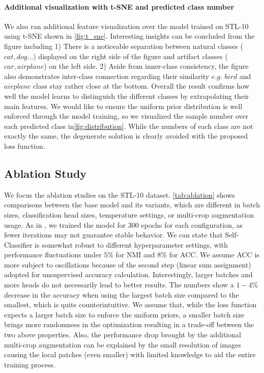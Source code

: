\documentclass{article}
\begin{document}
\paragraph{Additional visualization with t-SNE and predicted class number}
We also ran additional feature visualization over the model trained on STL-10 using t-SNE shown in \autoref{fig:t_sne}. Interesting insights can be concluded from the figure including 1) There is a noticeable separation between natural classes ($cat, dog...$) displayed on the right side of the figure and artifact classes ($car, airplane$) on the left side. 2) Aside from inner-class consistency, the figure also demonstrates inter-class connection regarding their similarity $e.g.$ $bird$ and $airplane$ class stay rather close at the bottom. Overall the result confirms how well the model learns to distinguish the different classes by extrapolating their main features. We would like to ensure the uniform prior distribution is well enforced through the model training, so we visualized the sample number over each predicted class in\autoref{fig:distribution}. While the numbers of each class are not exactly the same, the degenerate solution is clearly avoided with the proposed loss function.

\subsection{Ablation Study}

We focus the ablation studies on the STL-10 \cite{stl_10} dataset. \autoref{tab:ablation} shows comparisons between the base model and its variants, which are different in batch sizes, classification head sizes, temperature settings, or multi-crop augmentation usage. As in \cite{byol}, we trained the model for 300 epochs for each configuration, as fewer iterations may not guarantee stable behavior. We can state that Self-Classifier is somewhat robust to different hyperparameter settings, with performance fluctuations under $5\%$ for NMI and $8\%$ for ACC. We assume ACC is more subject to oscillations because of the second step (linear sum assignment) adopted for unsupervised accuracy calculation. Interestingly, larger batches and more heads do not necessarily lead to better results. The numbers show a $1-4\%$ decrease in the accuracy when using the largest batch size compared to the smallest, which is quite counterintuitive. We assume that, while the loss function expects a larger batch size to enforce the uniform priors, a smaller batch size brings more randomness in the optimization resulting in a trade-off between the two above properties. Also, the performance drop brought by the additional multi-crop augmentation can be explained by the small resolution of images causing the local patches (even smaller) with limited knowledge to aid the entire training process.
\end{document}

